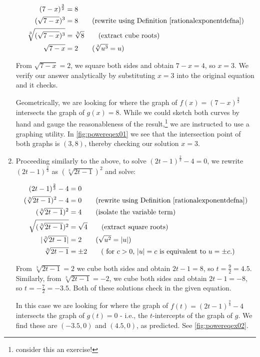 \begin{ex}
\begin{enumerate}
\begin{align*}
(7-x)^{\frac{3}{2}} & = 8 \\
(\sqrt{7-x})^3 & = 8 \tag{rewrite using Definition \ref{rationalexponentdefna}} \\
\sqrt[3]{(\sqrt{7-x})^3} & = \sqrt[3]{8} \tag{extract cube roots}  \\
\sqrt{7-x} & = 2 \tag{$\sqrt[3]{u^3}= u$}
\end{align*}

From $\sqrt{7-x} =  2$, we square both sides and obtain $7-x = 4$, so $x = 3$.  We verify our answer analytically by substituting $x=3$ into the original equation and it checks.

Geometrically, we are looking for where the graph of $f(x) = (7-x)^{\frac{3}{2}}$ intersects the graph of $g(x) = 8$.  While we could sketch both curves by hand and gauge the reasonableness of the result,\footnote{consider this an exercise!} we are instructed to use a graphing utility.  In \autoref{fig:powereqex01} we see that the intersection point of both graphs is $(3,8)$, thereby checking our solution $x = 3$.

\item  Proceeding similarly to the above, to solve $(2t-1)^{\frac{2}{3}} -4 = 0$, we rewrite $(2t-1)^{\frac{2}{3}}$ as $(\sqrt[3]{2t-1})^2$ and solve:

\begin{align*}
(2t-1)^{\frac{2}{3}} -4  & = 0 \\
(\sqrt[3]{2t-1})^2 - 4 & = 0 \tag{rewrite using Definition \ref{rationalexponentdefna}} \\
(\sqrt[3]{2t-1})^2 & = 4 \tag{isolate the variable term} \\
\sqrt{(\sqrt[3]{2t-1})^2 } & = \sqrt{4} \tag{extract square roots} \\
|\sqrt[3]{2t-1}| & = 2 \tag{$\sqrt{u^2} = |u|$} \\
\sqrt[3]{2t-1} & = \pm 2 \tag{ for $c>0$, $|u| = c$ is equivalent to $u = \pm c$.}
\end{align*}

From $\sqrt[3]{2t-1}  = 2$ we cube both sides and obtain $2t-1 = 8$, so $t = \frac{9}{2} = 4.5$.  Similarly, from $\sqrt[3]{2t-1}  = -2$, we cube both sides and obtain $2t-1 = -8$, so $t = -\frac{7}{2} = -3.5$.  Both of these solutions check in the given equation.

In this case we are looking for where the graph of $f(t) = (2t-1)^{\frac{2}{3}} -4$ intersects the graph of $g(t) = 0$ - i.e., the $t$-intercepts of the graph of $g$.  We find these are $(-3.5,0)$ and $(4.5,0)$, as predicted. See \autoref{fig:powereqex02}.


\end{enumerate}
\end{ex}
